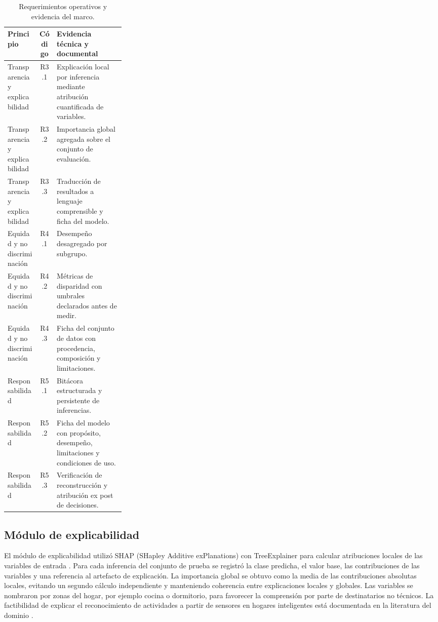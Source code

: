 \begin{table}[htbp]
  \caption{Requerimientos operativos y evidencia del marco.}
  \label{cuadro:requerimientos}
  \small
  \begin{tabularx}{\linewidth}{@{}>{\raggedright\arraybackslash}p{0.27\linewidth}c>{\raggedright\arraybackslash}X@{}}
    \toprule
    Principio & Código & Evidencia técnica y documental \\
    \midrule
    Transparencia y explicabilidad & R3.1 & Explicación local por inferencia mediante atribución cuantificada de variables. \\
    Transparencia y explicabilidad & R3.2 & Importancia global agregada sobre el conjunto de evaluación. \\
    Transparencia y explicabilidad & R3.3 & Traducción de resultados a lenguaje comprensible y ficha del modelo. \\
    \midrule
    Equidad y no discriminación & R4.1 & Desempeño desagregado por subgrupo. \\
    Equidad y no discriminación & R4.2 & Métricas de disparidad con umbrales declarados antes de medir. \\
    Equidad y no discriminación & R4.3 & Ficha del conjunto de datos con procedencia, composición y limitaciones. \\
    \midrule
    Responsabilidad & R5.1 & Bitácora estructurada y persistente de inferencias. \\
    Responsabilidad & R5.2 & Ficha del modelo con propósito, desempeño, limitaciones y condiciones de uso. \\
    Responsabilidad & R5.3 & Verificación de reconstrucción y atribución ex post de decisiones. \\
    \bottomrule
  \end{tabularx}
\end{table}

\subsection{Módulo de explicabilidad}

El módulo de explicabilidad utilizó SHAP (SHapley Additive exPlanations) con TreeExplainer para calcular
atribuciones locales de las variables de entrada
\cite{lundberg2017shap,lundberg2020treeshap}. Para cada inferencia del conjunto
de prueba se registró la clase predicha, el valor base, las contribuciones de
las variables y una referencia al artefacto de explicación. La importancia
global se obtuvo como la media de las contribuciones absolutas locales, evitando
un segundo cálculo independiente y manteniendo coherencia entre explicaciones
locales y globales. Las variables se nombraron por zonas del hogar, por ejemplo
cocina o dormitorio, para favorecer la comprensión por parte de destinatarios no
técnicos. La factibilidad de explicar el reconocimiento de actividades a partir
de sensores en hogares inteligentes está documentada en la literatura del dominio
\cite{arrotta2022dexar}.

